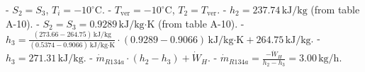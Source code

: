 - \( S_2 = S_3 \), \( T_i = -10^\circ \text{C} \).  
- \( T_{\text{ver}} = -10^\circ \text{C} \), \( T_2 = T_{\text{ver}} \).  
- \( h_2 = 237.74 \, \text{kJ/kg} \) (from table A-10).  
- \( S_2 = S_3 = 0.9289 \, \text{kJ/kg·K} \) (from table A-10).  
- \( h_3 = \frac{(273.66 - 264.75) \, \text{kJ/kg}}{(0.5374 - 0.9066) \, \text{kJ/kg·K}} \cdot (0.9289 - 0.9066) \, \text{kJ/kg·K} + 264.75 \, \text{kJ/kg} \).  
- \( h_3 = 271.31 \, \text{kJ/kg} \).  
- \( \dot{m}_{R134a} \cdot (h_2 - h_3) + \dot{W}_H \).  
- \( \dot{m}_{R134a} = \frac{-\dot{W}_H}{h_2 - h_3} = 3.00 \, \text{kg/h} \).